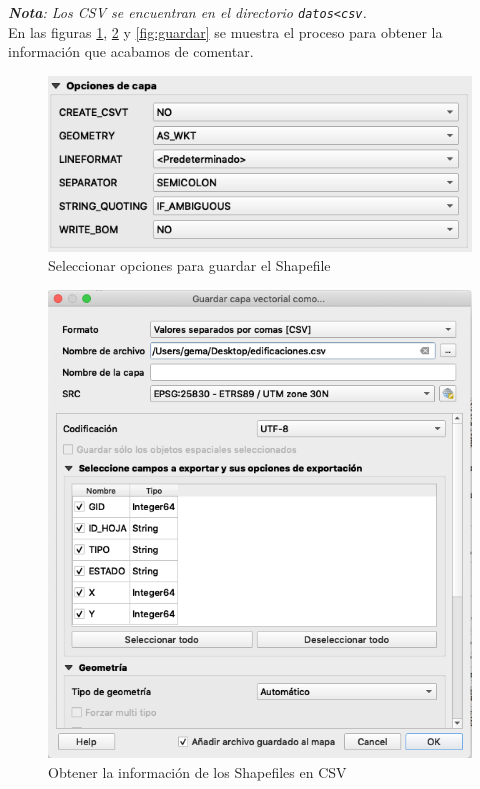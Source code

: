\textit{\textbf{Nota}: Los CSV se encuentran en el directorio \texttt{datos<csv}.}\\

En las figuras \ref{fig:opciones}, \ref{fig:csv} y \ref{fig:guardar} se muestra el proceso para obtener la información que acabamos de comentar.

\begin{figure}[H]
	\centering
	\includegraphics[width=0.7\linewidth]{imagenes/capitulo5/opciones}
	\caption{Seleccionar opciones para guardar el Shapefile}
	\label{fig:opciones}
\end{figure}

\begin{figure}[H]
	\centering
	\includegraphics[width=0.68\linewidth]{imagenes/capitulo5/csv}
	\caption{Obtener la información de los Shapefiles en CSV}
	\label{fig:csv}
\end{figure}






